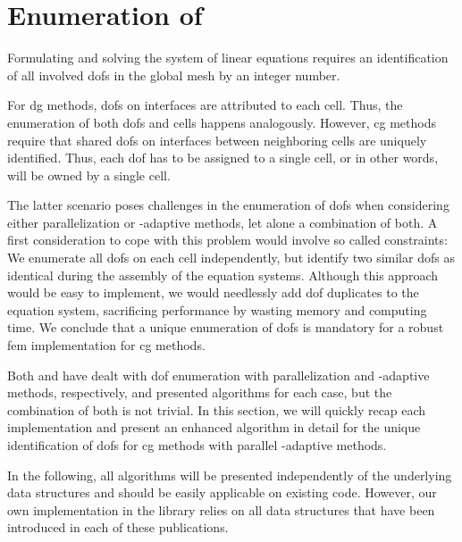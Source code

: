 \section{Enumeration of }
\label{sec:enumeration}

Formulating and solving the system of linear equations requires an identification of all involved \glspl{dof} in the global mesh by an integer number.

For \gls{dg} methods, \glspl{dof} on interfaces are attributed to each cell. Thus, the enumeration of both \glspl{dof} and cells happens analogously. However, \gls{cg} methods require that shared \glspl{dof} on interfaces between neighboring cells are uniquely identified. Thus, each \gls{dof} has to be assigned to a single cell, or in other words, will be owned by a single cell.

The latter scenario poses challenges in the enumeration of \glspl{dof} when considering either parallelization or \hp-adaptive methods, let alone a combination of both. A first consideration to cope with this problem would involve so called constraints: We enumerate all \glspl{dof} on each cell independently, but identify two similar \glspl{dof} as identical during the assembly of the equation systems. Although this approach would be easy to implement, we would needlessly add \gls{dof} duplicates to the equation system, sacrificing performance by wasting memory and computing time. We conclude that a unique enumeration of \glspl{dof} is mandatory for a robust \gls{fem} implementation for \gls{cg} methods.

Both \textcite{bangerth2012} and \textcite{bangerth2009} have dealt with \gls{dof} enumeration with parallelization and \hp-adaptive methods, respectively, and presented algorithms for each case, but the combination of both is not trivial. In this section, we will quickly recap each implementation and present an enhanced algorithm in detail for the unique identification of \glspl{dof} for \gls{cg} methods with parallel \hp-adaptive methods.

In the following, all algorithms will be presented independently of the underlying data structures and should be easily applicable on existing code. However, our own implementation in the \dealii{} library relies on all data structures that have been introduced in each of these publications.


